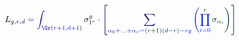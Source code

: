 \documentclass[12pt]{article}
\begin{document}
\makeatletter
\renewcommand*{\@textcolor}[3]{%
  \protect\leavevmode
  \begingroup
    \color#1{#2}#3%
  \endgroup
}
\makeatother
\begin{displaymath}
\mathcolor[RGB]{0,0,15}{L} _ { \mathcolor[RGB]{0,0,30}{g} \mathcolor[RGB]{0,0,45}{,} \mathcolor[RGB]{0,0,60}{r} \mathcolor[RGB]{0,0,75}{,} \mathcolor[RGB]{0,0,90}{d} } \mathcolor[RGB]{0,0,105}{=} \mathcolor[RGB]{0,0,120}{\int} _ { \mathcolor[RGB]{0,0,135}{\Gr} \mathcolor[RGB]{0,0,150}{(} \mathcolor[RGB]{0,0,165}{r} \mathcolor[RGB]{0,0,180}{+} \mathcolor[RGB]{0,0,195}{1} \mathcolor[RGB]{0,0,210}{,} \mathcolor[RGB]{0,0,225}{d} \mathcolor[RGB]{0,0,240}{+} \mathcolor[RGB]{0,0,255}{1} \mathcolor[RGB]{0,15,0}{)} } \mathcolor[RGB]{0,15,15}{\sigma} _ { \mathcolor[RGB]{0,15,30}{1} ^ { \mathcolor[RGB]{0,15,45}{r} } } ^ { \mathcolor[RGB]{0,15,60}{g} } \mathcolor[RGB]{0,15,75}{\cdot} \mathcolor[RGB]{0,15,90}{\left[} \mathcolor[RGB]{0,15,105}{\sum} _ { \mathcolor[RGB]{0,15,120}{\alpha} _ { \mathcolor[RGB]{0,15,135}{0} } \mathcolor[RGB]{0,15,150}{+} \mathcolor[RGB]{0,15,165}{.} \mathcolor[RGB]{0,15,180}{.} \mathcolor[RGB]{0,15,195}{.} \mathcolor[RGB]{0,15,210}{+} \mathcolor[RGB]{0,15,225}{\alpha} _ { \mathcolor[RGB]{0,15,240}{r} } \mathcolor[RGB]{0,15,255}{=} \mathcolor[RGB]{0,30,0}{(} \mathcolor[RGB]{0,30,15}{r} \mathcolor[RGB]{0,30,30}{+} \mathcolor[RGB]{0,30,45}{1} \mathcolor[RGB]{0,30,60}{)} \mathcolor[RGB]{0,30,75}{(} \mathcolor[RGB]{0,30,90}{d} \mathcolor[RGB]{0,30,105}{-} \mathcolor[RGB]{0,30,120}{r} \mathcolor[RGB]{0,30,135}{)} \mathcolor[RGB]{0,30,150}{-} \mathcolor[RGB]{0,30,165}{r} \mathcolor[RGB]{0,30,180}{g} } \mathcolor[RGB]{0,30,195}{\left(} \mathcolor[RGB]{0,30,210}{\prod} _ { \mathcolor[RGB]{0,30,225}{i} \mathcolor[RGB]{0,30,240}{=} \mathcolor[RGB]{0,30,255}{0} } ^ { \mathcolor[RGB]{0,45,0}{r} } \mathcolor[RGB]{0,45,15}{\sigma} _ { \mathcolor[RGB]{0,45,30}{\alpha} _ { \mathcolor[RGB]{0,45,45}{i} } } \mathcolor[RGB]{0,45,60}{\right)} \mathcolor[RGB]{0,45,75}{\right]}
\end{displaymath}
\end{document}
